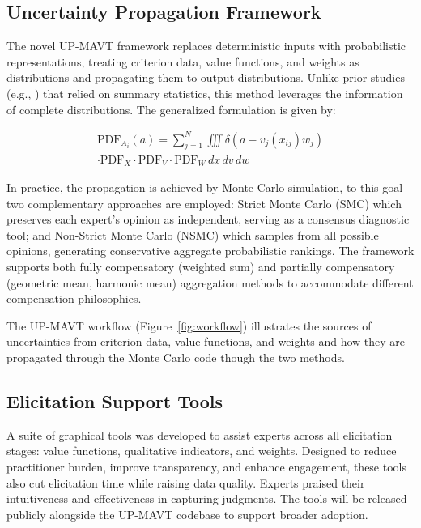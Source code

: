 \documentclass[11pt,a4paper,twocolumn]{article}
\begin{document}
\subsection{Uncertainty Propagation Framework}
The novel UP-MAVT framework replaces deterministic inputs with probabilistic representations, treating criterion data, value functions, and weights as distributions and propagating them to output distributions. Unlike prior studies (e.g., \cite{Ezbakhe2018}) that relied on summary statistics, this method leverages the information of complete distributions. The generalized formulation is given by:

\begin{multline}
\text{PDF}_{A_i}(a) = \sum_{j=1}^N \iiint \delta\left(a - v_j(x_{ij})w_j\right) \\
\cdot \text{PDF}_X \cdot \text{PDF}_V \cdot \text{PDF}_W \, dx \, dv \, dw
\label{eq:mavt_up}
\end{multline}

In practice, the propagation is achieved by Monte Carlo simulation, to this goal two complementary approaches are employed: Strict Monte Carlo (SMC) which preserves each expert's opinion as independent, serving as a consensus diagnostic tool; and Non-Strict Monte Carlo (NSMC) which samples from all possible opinions, generating conservative aggregate probabilistic rankings. The framework supports both fully compensatory (weighted sum) and partially compensatory (geometric mean, harmonic mean) aggregation methods to accommodate different compensation philosophies.

The UP-MAVT workflow (Figure~\ref{fig:workflow}) illustrates the sources of uncertainties from criterion data, value functions, and weights and how they are propagated through the Monte Carlo code though the two methods.

\subsection{Elicitation Support Tools}
A suite of graphical tools was developed to assist experts across all elicitation stages: value functions, qualitative indicators, and weights. Designed to reduce practitioner burden, improve transparency, and enhance engagement, these tools also cut elicitation time while raising data quality. Experts praised their intuitiveness and effectiveness in capturing judgments. The tools will be released publicly alongside the UP-MAVT codebase to support broader adoption.
\end{document}
